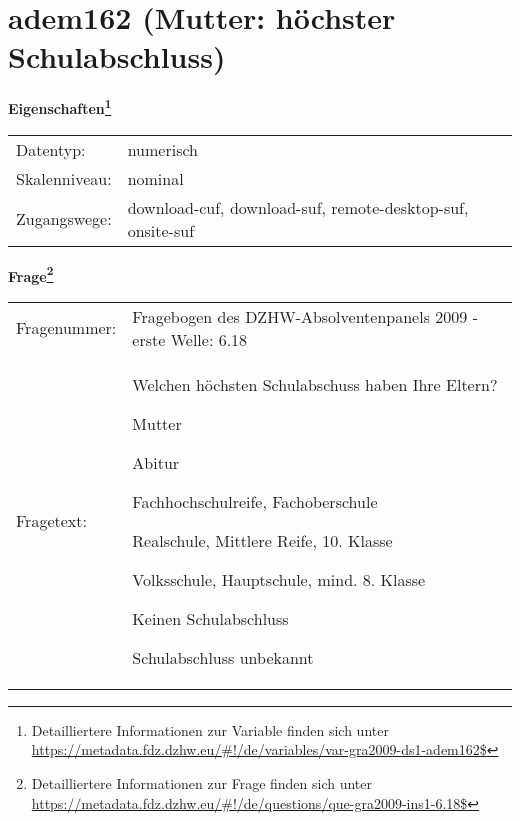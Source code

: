 
    \setcounter{footnote}{0}

    \vspace*{-1.8cm}
	\section{adem162 (Mutter: höchster Schulabschluss)}
	\label{section:adem162}



    \vspace*{0.5cm}
    \noindent\textbf{Eigenschaften\footnote{Detailliertere Informationen zur Variable finden sich unter
		\url{https://metadata.fdz.dzhw.eu/\#!/de/variables/var-gra2009-ds1-adem162$}}}\\
	\begin{tabularx}{\hsize}{@{}lX}
	Datentyp: & numerisch \\
	Skalenniveau: & nominal \\
	Zugangswege: &
	  download-cuf, 
	  download-suf, 
	  remote-desktop-suf, 
	  onsite-suf
 \\
    \end{tabularx}



				\vspace*{0.5cm}
                \noindent\textbf{Frage\footnote{Detailliertere Informationen zur Frage finden sich unter
		              \url{https://metadata.fdz.dzhw.eu/\#!/de/questions/que-gra2009-ins1-6.18$}}}\\
				\begin{tabularx}{\hsize}{@{}lX}
					Fragenummer: &
					  Fragebogen des DZHW-Absolventenpanels 2009 - erste Welle:
					  6.18
 \\
					Fragetext: & Welchen höchsten Schulabschuss haben Ihre Eltern?\par  Mutter\par  Abitur\par  Fachhochschulreife, Fachoberschule\par  Realschule, Mittlere Reife, 10. Klasse\par  Volksschule, Hauptschule, mind. 8. Klasse\par  Keinen Schulabschluss\par  Schulabschluss unbekannt \\
				\end{tabularx}





